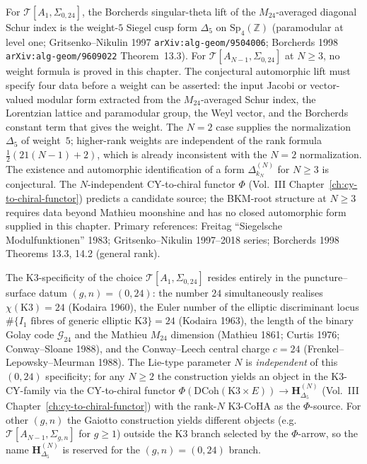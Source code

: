 \begin{remark}
\label{rem:thqg-occ-siegel}
For $\mathcal T[A_1, \Sigma_{0,24}]$, the Borcherds singular-theta
lift of the $M_{24}$-averaged diagonal Schur index is the weight-$5$
Siegel cusp form $\Delta_5$ on $\mathrm{Sp}_4(\mathbb{Z})$ (paramodular
at level one; Gritsenko--Nikulin 1997
\texttt{arXiv:alg-geom/9504006}; Borcherds 1998
\texttt{arXiv:alg-geom/9609022} Theorem~13.3). For
$\mathcal T[A_{N-1}, \Sigma_{0,24}]$ at $N \ge 3$, no weight formula
is proved in this chapter. The conjectural automorphic lift must
specify four data before a weight can be asserted: the input Jacobi
or vector-valued modular form extracted from the $M_{24}$-averaged
Schur index, the Lorentzian lattice and paramodular group, the Weyl
vector, and the Borcherds constant term that gives the weight. The
$N=2$ case supplies the normalization $\Delta_5$ of weight~$5$;
higher-rank weights are independent of the rank formula
$\tfrac12(21(N-1)+2)$, which is already inconsistent with the $N=2$
normalization. The existence and automorphic identification of a
form $\Delta_{k_N}^{(N)}$ for $N \ge 3$ is conjectural. The
$N$-independent CY-to-chiral functor $\Phi$
(Vol.~III Chapter~\ref{ch:cy-to-chiral-functor}) predicts a
candidate source; the BKM-root structure at $N \ge 3$ requires data
beyond Mathieu moonshine and has no closed automorphic form supplied
in this chapter.
Primary references: Freitag ``Siegelsche Modulfunktionen'' 1983;
Gritsenko--Nikulin 1997--2018 series; Borcherds 1998 Theorems
13.3, 14.2 (general rank).
\end{remark}

\begin{remark}[K3-specificity of $(g, n) = (0, 24)$ at all $N$]
\label{rem:thqg-occ-k3-specificity}
The K3-specificity of the choice
$\mathcal T[A_1, \Sigma_{0,24}]$ resides entirely in the
puncture--surface datum $(g, n) = (0, 24)$: the number $24$
simultaneously realises
$\chi(\mathrm{K3}) = 24$ (Kodaira 1960),
the Euler number of the elliptic discriminant locus
$\#\{I_1\text{ fibres of generic elliptic K3}\} = 24$ (Kodaira 1963),
the length of the binary Golay code $\mathcal G_{24}$ and the Mathieu
$M_{24}$ dimension (Mathieu 1861; Curtis 1976; Conway--Sloane 1988),
and the Conway--Leech central charge $c = 24$
(Frenkel--Lepowsky--Meurman 1988). The Lie-type parameter $N$ is
\emph{independent} of this $(0, 24)$ specificity; for any $N \ge 2$
the construction yields an object in the K3-CY-family via the
CY-to-chiral functor
$\Phi(\mathrm{DCoh}(\mathrm{K3} \times E)) \to \mathbf H^{(N)}_{\Delta_5}$
(Vol.~III Chapter~\ref{ch:cy-to-chiral-functor}) with the rank-$N$
K3-CoHA as the $\Phi$-source. For other $(g, n)$ the Gaiotto
construction yields different objects (e.g.\
$\mathcal T[A_{N-1}, \Sigma_{g,n}]$ for $g \ge 1$) outside the
K3 branch selected by the $\Phi$-arrow, so the name
$\mathbf H^{(N)}_{\Delta_5}$ is
reserved for the $(g, n) = (0, 24)$ branch.
\end{remark}

